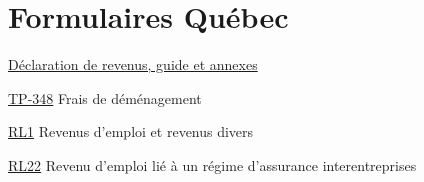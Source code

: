 \chapter*{Formulaires Québec \qct}

\href{https://www.revenuquebec.ca/fr/services-en-ligne/formulaires-et-publications/details-courant/tp-1/}{Déclaration de revenus, guide et annexes}

\href{https://www.revenuquebec.ca/fr/services-en-ligne/formulaires-et-publications/details-courant/tp-348/}{TP-348}
Frais de déménagement 

\href{https://www.revenuquebec.ca/fr/services-en-ligne/formulaires-et-publications/details-courant/rl-1/}{RL1}
Revenus d'emploi et revenus divers

\href{https://www.revenuquebec.ca/fr/services-en-ligne/formulaires-et-publications/details-courant/rl-22/}{RL22}
Revenu d'emploi lié à un régime d'assurance interentreprises

